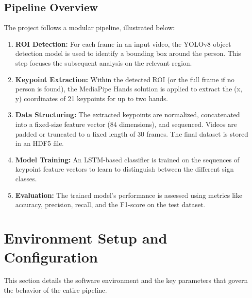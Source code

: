 \documentclass[11pt, a4paper]{article}
\begin{document}
\subsection{Pipeline Overview}
The project follows a modular pipeline, illustrated below:
\begin{enumerate}[label=\textbf{Step \arabic*:}]
    \item \textbf{ROI Detection:} For each frame in an input video, the YOLOv8 object detection model is used to identify a bounding box around the person. This step focuses the subsequent analysis on the relevant region.
    \item \textbf{Keypoint Extraction:} Within the detected ROI (or the full frame if no person is found), the MediaPipe Hands solution is applied to extract the (x, y) coordinates of 21 keypoints for up to two hands.
    \item \textbf{Data Structuring:} The extracted keypoints are normalized, concatenated into a fixed-size feature vector (84 dimensions), and sequenced. Videos are padded or truncated to a fixed length of 30 frames. The final dataset is stored in an HDF5 file.
    \item \textbf{Model Training:} An LSTM-based classifier is trained on the sequences of keypoint feature vectors to learn to distinguish between the different sign classes.
    \item \textbf{Evaluation:} The trained model's performance is assessed using metrics like accuracy, precision, recall, and the F1-score on the test dataset.
\end{enumerate}

\section{Environment Setup and Configuration}
This section details the software environment and the key parameters that govern the behavior of the entire pipeline.
\end{document}
